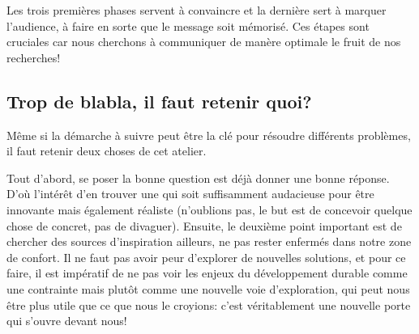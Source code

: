 Les trois premières phases servent à convaincre et la dernière sert à marquer l’audience, à faire en sorte que le message soit mémorisé. Ces étapes sont cruciales car nous cherchons à communiquer de manère optimale le fruit de nos recherches!


\subsection{Trop de blabla, il faut retenir quoi?}

Même si la démarche à suivre peut être la clé pour résoudre différents problèmes, il faut retenir deux choses de cet atelier. 

Tout d'abord, se poser la bonne question est déjà donner une bonne réponse. D’où l’intérêt d'en trouver une qui soit suffisamment audacieuse pour être innovante mais également réaliste (n'oublions pas, le but est de concevoir quelque chose de concret, pas de divaguer). Ensuite, le deuxième point important est de chercher des sources d'inspiration ailleurs, ne pas rester enfermés dans notre zone de confort. Il ne faut pas avoir peur d'explorer de nouvelles solutions, et pour ce faire, il est impératif de ne pas voir les enjeux du développement durable comme une contrainte mais plutôt comme une nouvelle voie d'exploration, qui peut nous être plus utile que ce que nous le croyions: c'est véritablement une nouvelle porte qui s'ouvre devant nous!
